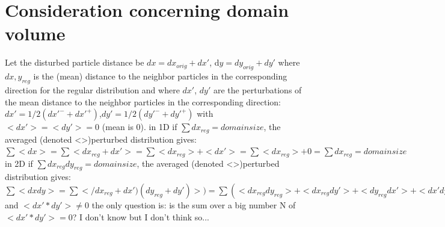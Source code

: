 \documentclass{report}
\begin{document}
\appendix
\appendixpage
\addappheadtotoc

\chapter{Consideration concerning domain volume}
 Let the disturbed particle distance be $dx=dx_{\mathit{orig}}+dx'$, d$y=dy_{\mathit{orig}}+dy'$ where $dx,y_{\mathit{reg}}$ is the (mean) distance to the neighbor particles in the corresponding direction for the regular distribution
 and where $dx'$, $dy'$ are the perturbations of the mean distance to the neighbor particles in the corresponding direction:
 $dx'=1/2(dx'^-+dx'^+)$,$dy'=1/2(dy'^-+dy'^+)$ with $<dx'>=<dy'>=0$ (mean is 0).
 in 1D if $\sum dx_{\mathit{reg}}=domainsize$, the averaged (denoted <>)perturbed distribution gives: $\sum <dx>=\sum <dx_{\mathit{reg}}+dx'>=\sum <dx_{\mathit{reg}}>+<dx'>=\sum<dx_{\mathit{reg}}>+0=\sum dx_{\mathit{reg}}=domainsize$
 in 2D if $\sum dx_{\mathit{reg}}dy_{\mathit{reg}}=domainsize$, the averaged (denoted <>)perturbed distribution gives:    $\sum <dxdy>=\sum </dx_{\mathit{reg}}+dx')(dy_{\mathit{reg}}+dy')>)=\sum (<dx_{\mathit{reg}}dy_{\mathit{reg}}>+<dx_{\mathit{reg}}dy'>+<dy_{\mathit{reg}}dx'>+<dx'dy>)=\sum (dx_{\mathit{reg}}dy_{\mathit{reg}})+\sum (<dx'dy'>)=domainsize+sum(<dx'dy'>)$
 and $<dx'*dy'>\neq0$ the only question is: is the sum over a big number N of $<dx'*dy'> =0$? I don't know but I don't think so...
\end{document}

